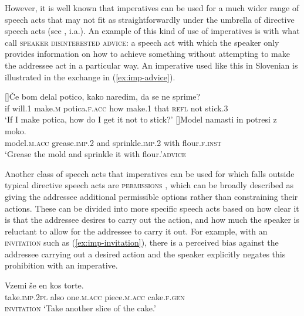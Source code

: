 \documentclass[output=paper,colorlinks,citecolor=brown]{langscibook}
\begin{document}
\noindent However, it is well known that imperatives can be used for a much wider range of speech acts that may not fit as straightforwardly under the umbrella of directive speech acts (see \citealt{schmerling82,davies86,wilsonsperber88,han99,kaufmann21}, i.a.). An example of this kind of use of imperatives is with what \citet{condoravdi-lauer12cssp} call \textsc{speaker disinterested advice}: a speech act with which the speaker only provides information on how to achieve something without attempting to make the addressee act in a particular way. An imperative used like this in Slovenian is illustrated in the exchange in (\ref{ex:imp-advice}).
\begin{exe}
\ex \label{ex:imp-advice}
\begin{xlist}
[]{\gll \v{C}e bom delal potico, kako naredim, da se ne sprime?\\
                if will.\textsc{1} make.\textsc{m} potica.\textsc{f.acc} how make.\textsc{1} that \textsc{refl} not stick.\textsc{3}\\ 
            \glt `If I make potica, how do I get it not to stick?'}
[]{\gll Model namasti in potresi z moko.\\
                model.\textsc{m.acc} grease.\textsc{imp.2} and sprinkle.\textsc{imp.2} with flour.\textsc{f.inst}\\ 
            \glt `Grease the mold and sprinkle it with flour.'\hfill {}\textsc{advice}}%
\end{xlist}
\end{exe}

\noindent Another class of speech acts that imperatives can be used for which falls outside typical directive speech acts are \textsc{permissions} \citep[see][]{portner07,kaufmannBOOK,oikonomou16}, which can be broadly described as giving the addressee additional permissible options rather than constraining their actions. These can be divided into more specific speech acts based on how clear it is that the addressee desires to carry out the action, and how much the speaker is reluctant to allow for the addressee to carry it out. For example, with an \textsc{invitation} such as (\ref{ex:imp-invitation}), there is a perceived bias against the addressee carrying out a desired action and the speaker explicitly negates this prohibition with an imperative. 

\ea \gll Vzemi \v{s}e en kos torte.\\
         take.\textsc{imp.2pl} also one.\textsc{m.acc} piece.\textsc{m.acc} cake.\textsc{f.gen}\\ \hfill \textsc{invitation}%
    \glt `Take another slice of the cake.' \label{ex:imp-invitation}
\z
\end{document}
